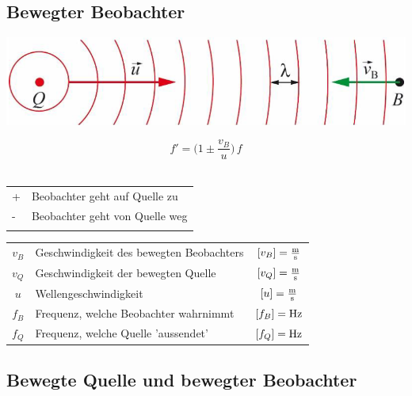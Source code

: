 \subsection{Bewegter Beobachter}

\begin{minipage}{0.48\linewidth}
\includegraphics[width=0.98\linewidth]{Bilder/Wellen-Optik/bewegter_beobachter} \\
\end{minipage}
\hfill
\begin{minipage}{0.48\linewidth}
$$ \boxed{f' = \Big( 1 \pm \frac{v_B}{u}  \Big) \, f }$$\\
\end{minipage}




\begin{tabular}{ll}
+ & Beobachter geht auf Quelle zu \\
- & Beobachter geht von Quelle weg\\
\\
\end{tabular}


\begin{tabular}{clc}
$v_B$ & Geschwindigkeit des bewegten Beobachters & $[v_B] = \frac{\mathrm{m}}{\mathrm{s}}$ \\
$v_Q$ & Geschwindigkeit der bewegten Quelle & $[v_Q] = \frac{\mathrm{m}}{\mathrm{s}}$ \\
$u$ & Wellengeschwindigkeit & $[u] = \frac{\mathrm{m}}{\mathrm{s}}$ \\
$f_B$ & Frequenz, welche Beobachter wahrnimmt & $[f_B] = \mathrm{Hz}$ \\
$f_Q$ & Frequenz, welche Quelle 'aussendet' & $[f_Q] = \mathrm{Hz}$ 
\end{tabular}




\subsection{Bewegte Quelle \textbf{und} bewegter Beobachter}

